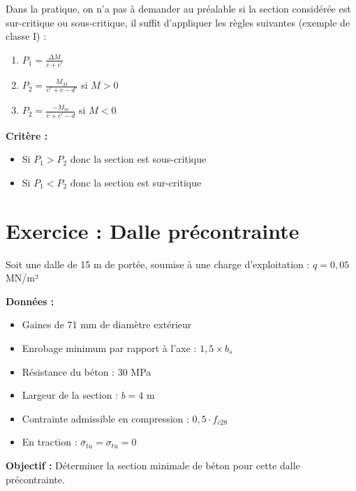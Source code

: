 \documentclass[12pt,a4paper]{article}
\begin{document}
\begin{successbox}
Dans la pratique, on n'a pas à demander au préalable si la section considérée est sur-critique ou sous-critique, il suffit d'appliquer les règles suivantes (exemple de classe I) :

\begin{enumerate}
    \item $P_1 = \frac{\Delta M}{c + c'}$
    \item $P_2 = \frac{M_M}{v' + c - d'}$ si $M > 0$
    \item $P_2 = \frac{-M_m}{v + c' - d}$ si $M < 0$
\end{enumerate}

\textbf{Critère :}
\begin{itemize}
    \item Si $P_1 > P_2$ donc la section est sous-critique
    \item Si $P_1 < P_2$ donc la section est sur-critique
\end{itemize}
\end{successbox}

\section{Exercice : Dalle précontrainte}

\begin{examplebox}
Soit une dalle de 15 m de portée, soumise à une charge d'exploitation : $q = 0,05$ MN/m²

\textbf{Données :}
\begin{itemize}
    \item Gaines de 71 mm de diamètre extérieur
    \item Enrobage minimum par rapport à l'axe : $1,5 \times b_s$
    \item Résistance du béton : 30 MPa
    \item Largeur de la section : $b = 4$ m
    \item Contrainte admissible en compression : $0,5 \cdot f_{c28}$
    \item En traction : $\bar{\sigma}_{tu} = \sigma_{tu} = 0$
\end{itemize}

\textbf{Objectif :} Déterminer la section minimale de béton pour cette dalle précontrainte.
\end{examplebox}

\end{document}
